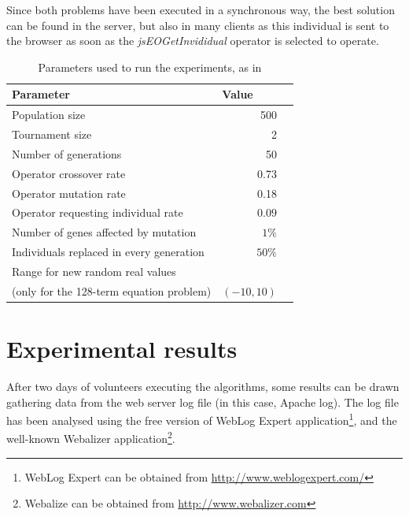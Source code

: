 \documentclass[runningheads,a4paper]{llncs}
\begin{document}
Since both problems have been executed in a synchronous way, the best solution can be found in the server, but also in many clients as this individual is sent to the browser as soon as the \textit{jsEOGetInvididual} operator is selected to operate.



\begin{table}
\caption{Parameters used to run the experiments, as in{\cite{agajaj}}}
\begin{center}
\begin{tabular}{l@{\quad}rl}
\hline
\multicolumn{1}{l}{\rule{0pt}{12pt}
                   Parameter}&\multicolumn{2}{l}{Value}\\[2pt]
\hline\rule{0pt}{12pt}
Population size & 500 & \\
Tournament size & 2 & \\
Number of generations  & 50 & \\
Operator crossover rate & 0.73 & \\
Operator mutation rate & 0.18 & \\
Operator requesting individual rate & $0.09$ & \\
Number of genes affected by mutation & $1\%$ &\\
Individuals replaced in every generation & $50\%$ & \\
Range for new random real values && \\
(only for the 128-term equation problem) & $(-10,10)$ & \\[2pt]
\hline

\end{tabular}
\label{tb:params}
\end{center}
\end{table}

  	




\section{Experimental results}
\label{sec:exp}

After two days of volunteers executing the algorithms, some results can be drawn gathering data from the web server log file (in this case, Apache log). The log file has been analysed using the free version of WebLog Expert application\footnote{WebLog Expert can be obtained from \url{http://www.weblogexpert.com/}}, and the well-known Webalizer application\footnote{Webalize can be obtained from \url{http://www.webalizer.com}}.
\end{document}
